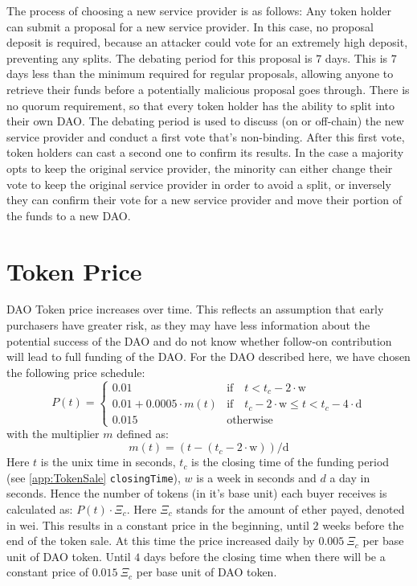 \documentclass[9pt,oneside]{amsart}
\begin{document}
\begin{multicols}{2}
The process of choosing a new service provider is as follows:
Any token holder can submit a proposal for a new service provider. In this case, no proposal deposit is required, because an attacker could vote for an extremely high deposit, preventing any splits. The debating period for this proposal is $7$ days.
This is $7$ days less than the minimum required for regular proposals, allowing anyone to retrieve their funds before a potentially malicious proposal goes through. There is no quorum requirement, so that every token holder has the ability to split into their own DAO. 
The debating period is used to discuss (on or off-chain) the new service provider and conduct a first vote that's non-binding. After this first vote, token holders can cast a second one to confirm its results. In the case a majority opts to  keep the original service provider, the minority can either change their vote to keep the original service provider in order to avoid a split, or inversely they can confirm their vote for a new service provider and move their portion of the funds to a new DAO.

\section{Token Price} \label{TokenPrice}
DAO Token price increases over time.  This reflects an assumption that early purchasers have greater risk, as they may have less information about the potential success of the DAO and do not know whether follow-on contribution will lead to full funding of the DAO.  
For the DAO described here, we have chosen the following price schedule:
\begin{equation}
 P(t) = \begin{cases}
0.01 & \text{if} \quad t < t_c - 2 \cdot \text{w} \\
0.01 + 0.0005 \cdot m(t) & \text{if} \quad t_c - 2 \cdot \text{w} \leqslant t < t_c - 4 \cdot \text{d} \\
0.015 & \text{otherwise}
\end{cases}
\end{equation}
with the multiplier $m$ defined as:
\begin{equation}
 m(t) = (t - (t_c - 2 \cdot \text{w})) / \text{d}
\end{equation}
Here $t$ is the unix time in seconds, $t_c$ is the closing time of the funding period (see \ref{app:TokenSale} \verb|closingTime|), $w$ is a week in seconds and $d$ a day in seconds.
Hence the number of tokens (in it’s base unit) each buyer receives is calculated as: $P(t) \cdot \Xi_c$. Here $\Xi_c$ stands for the amount of ether payed, denoted in wei.
This results in a constant price in the beginning, until $2$ weeks before the end of the token sale. At this time the price increased daily by $0.005 \: \Xi_c$ per base unit of DAO token. Until $4$ days before the closing time when there will be a constant price of $0.015 \: \Xi_c$ per base unit of DAO token.


\end{multicols}
\end{document}
